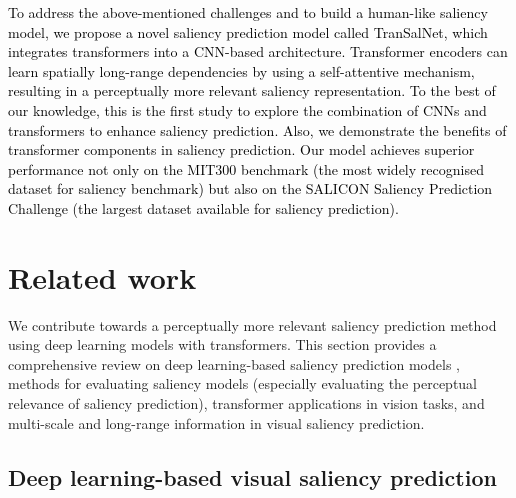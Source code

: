\documentclass{article}
\begin{document}
\textcolor{black}{To address the above-mentioned challenges and to build a human-like saliency model, we propose a novel saliency prediction model called TranSalNet, which integrates transformers into a CNN-based architecture. Transformer encoders can learn spatially long-range dependencies by using a self-attentive mechanism, resulting in a perceptually more relevant saliency representation. To the best of our knowledge, this is the first study to explore the combination of CNNs and transformers to enhance saliency prediction. Also, we demonstrate the benefits of transformer components in saliency prediction. Our model achieves superior performance not only on the MIT300 benchmark (the most widely recognised dataset for saliency benchmark) but also on the SALICON Saliency Prediction Challenge (the largest dataset available for saliency prediction).}




\section{Related work}

We contribute towards a perceptually more relevant saliency prediction method using deep learning models with transformers.
This section provides a comprehensive review on deep learning-based saliency prediction models , methods for evaluating saliency models (especially evaluating the perceptual relevance of saliency prediction), transformer applications in vision tasks, 
and multi-scale and long-range information in visual saliency prediction.

\subsection{Deep learning-based visual saliency prediction}
\end{document}
